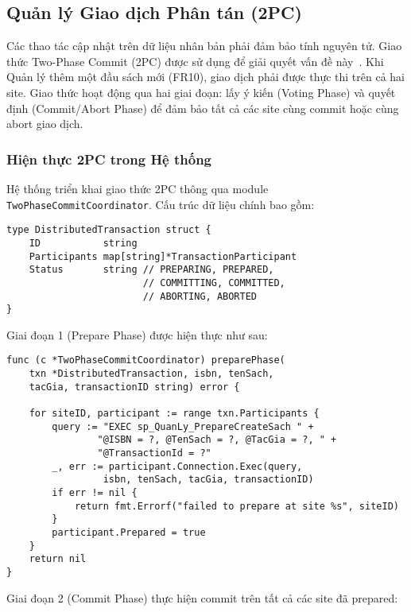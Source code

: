 \documentclass[conference]{IEEEtran}
\begin{document}
\subsection{Quản lý Giao dịch Phân tán (2PC)}
Các thao tác cập nhật trên dữ liệu nhân bản phải đảm bảo tính nguyên tử. Giao thức Two-Phase Commit (2PC) được sử dụng để giải quyết vấn đề này~\cite{ozsu_valduriez_2020}. Khi Quản lý thêm một đầu sách mới (FR10), giao dịch phải được thực thi trên cả hai site. Giao thức hoạt động qua hai giai đoạn: lấy ý kiến (Voting Phase) và quyết định (Commit/Abort Phase) để đảm bảo tất cả các site cùng commit hoặc cùng abort giao dịch.

\subsubsection{Hiện thực 2PC trong Hệ thống}
Hệ thống triển khai giao thức 2PC thông qua module \texttt{TwoPhaseCommitCoordinator}. Cấu trúc dữ liệu chính bao gồm:

\begin{Verbatim}[fontsize=\footnotesize,breaklines=true,breakanywhere=true]
type DistributedTransaction struct {
    ID           string
    Participants map[string]*TransactionParticipant
    Status       string // PREPARING, PREPARED, 
                        // COMMITTING, COMMITTED, 
                        // ABORTING, ABORTED
}
\end{Verbatim}

Giai đoạn 1 (Prepare Phase) được hiện thực như sau:

\begin{Verbatim}[fontsize=\footnotesize,breaklines=true,breakanywhere=true]
func (c *TwoPhaseCommitCoordinator) preparePhase(
    txn *DistributedTransaction, isbn, tenSach, 
    tacGia, transactionID string) error {
    
    for siteID, participant := range txn.Participants {
        query := "EXEC sp_QuanLy_PrepareCreateSach " +
                "@ISBN = ?, @TenSach = ?, @TacGia = ?, " +
                "@TransactionId = ?"
        _, err := participant.Connection.Exec(query, 
                 isbn, tenSach, tacGia, transactionID)
        if err != nil {
            return fmt.Errorf("failed to prepare at site %s", siteID)
        }
        participant.Prepared = true
    }
    return nil
}
\end{Verbatim}

Giai đoạn 2 (Commit Phase) thực hiện commit trên tất cả các site đã prepared:
\end{document}
